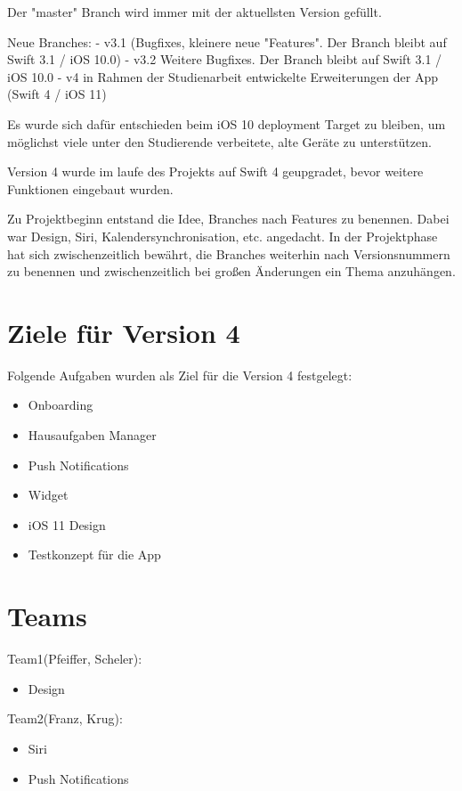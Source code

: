 Der "master" Branch wird immer mit der aktuellsten Version gefüllt.

Neue Branches:
- v3.1 (Bugfixes, kleinere neue "Features". Der Branch bleibt auf Swift 3.1  / iOS 10.0)
- v3.2 Weitere Bugfixes. Der Branch bleibt auf Swift 3.1  / iOS 10.0 %
- v4 in Rahmen der Studienarbeit entwickelte Erweiterungen der App (Swift 4 / iOS 11)




Es wurde sich dafür entschieden beim iOS 10 deployment Target zu bleiben, um möglichst viele unter den Studierende verbeitete, alte Geräte zu unterstützen.

Version 4 wurde im laufe des Projekts auf Swift 4 geupgradet, bevor weitere Funktionen eingebaut wurden.

Zu Projektbeginn entstand die Idee, Branches nach Features zu benennen. Dabei war Design, Siri, Kalendersynchronisation, etc. angedacht. In der Projektphase hat sich zwischenzeitlich bewährt, die Branches weiterhin nach Versionsnummern zu benennen und zwischenzeitlich bei großen Änderungen ein Thema anzuhängen.




\section{Ziele für Version 4}
Folgende Aufgaben wurden als Ziel für die Version 4 festgelegt:
\begin{itemize}
\item Onboarding
\item Hausaufgaben Manager
\item Push Notifications
\item Widget
\item iOS 11 Design
\item Testkonzept für die App
\end{itemize}


\section{Teams}

Team1(Pfeiffer, Scheler):
\begin{itemize}
\item Design
\end{itemize}


Team2(Franz, Krug):
\begin{itemize}
\item Siri
\item Push Notifications
\end{itemize}


